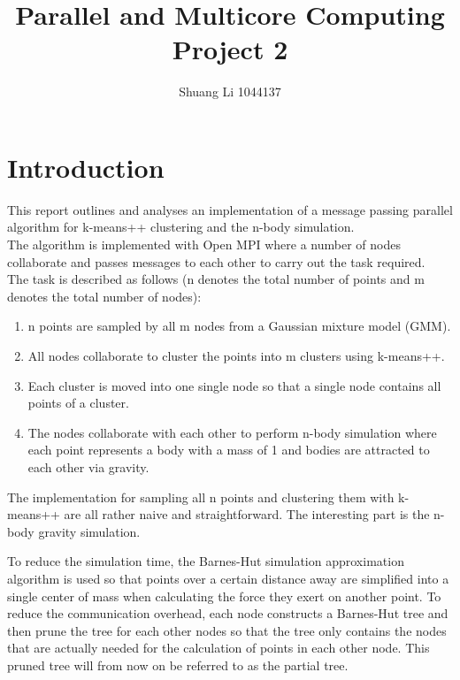 \documentclass{article}
\title{Parallel and Multicore Computing Project 2}
\author{Shuang Li 1044137}
\date{}
\begin{document}
\maketitle

\section*{Introduction}
This report outlines and analyses an implementation of a message passing parallel algorithm for
k-means++ clustering and the n-body simulation.\\
The algorithm is implemented with Open MPI where a number of nodes collaborate and passes messages
to each other to carry out the task required.\\
The task is described as follows (n denotes the total number of points and m denotes the total
number of nodes):
\begin{enumerate}
	\item n points are sampled by all m nodes from a Gaussian mixture model (GMM).
	\item All nodes collaborate to cluster the points into m clusters using k-means++.
	\item Each cluster is moved into one single node so that a single node contains all points of a
		cluster.
	\item The nodes collaborate with each other to perform n-body simulation where each point
		represents a body with a mass of 1 and bodies are attracted to each other via gravity.
\end{enumerate}

The implementation for sampling all n points and clustering them with k-means++ are all rather
naive and straightforward. The interesting part is the n-body gravity simulation.

To reduce the simulation time, the Barnes-Hut simulation approximation algorithm is used so that
points over a certain distance away are simplified into a single center of mass when calculating the
force they exert on another point. To reduce the communication overhead, each node constructs a
Barnes-Hut tree and then prune the tree for each other nodes so that the tree only contains the
nodes that are actually needed for the calculation of points in each other node. This pruned tree
will from now on be referred to as the partial tree.
\end{document}
